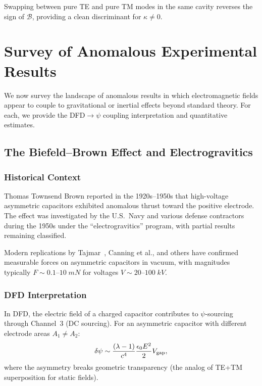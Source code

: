 \documentclass[aps,prd,twocolumn,superscriptaddress,floatfix,nofootinbib]{revtex4-2}
\newcommand{\lam}{\lambda}
\begin{document}
Swapping between pure TE and pure TM modes in the same cavity reverses the
sign of $\mathcal{B}$, providing a clean discriminant for $\kappa \neq 0$.

\section{Survey of Anomalous Experimental Results}\label{sec:anomalies}

We now survey the landscape of anomalous results in which electromagnetic
fields appear to couple to gravitational or inertial effects beyond standard
theory. For each, we provide the DFD$\to\psi$ coupling interpretation and
quantitative estimates.

\subsection{The Biefeld--Brown Effect and Electrogravitics}\label{sec:bb}

\subsubsection{Historical Context}

Thomas Townsend Brown reported in the 1920s--1950s that high-voltage
asymmetric capacitors exhibited anomalous thrust toward the positive
electrode. The effect was investigated by the U.S.\ Navy and various
defense contractors during the 1950s under the ``electrogravitics''
program, with partial results remaining classified.

Modern replications by Tajmar~\cite{Tajmar2004BB}, Canning et al., and
others have confirmed measurable forces on asymmetric capacitors in
vacuum, with magnitudes typically $F \sim 0.1$--$10\;\si{mN}$ for
voltages $V \sim 20$--$100\;\si{kV}$.

\subsubsection{DFD Interpretation}

In DFD, the electric field of a charged capacitor contributes to
$\psi$-sourcing through Channel~3 (DC sourcing). For an asymmetric
capacitor with different electrode areas $A_1 \neq A_2$:
\begin{equation}
\delta\psi \sim \frac{(\lam-1)}{c^4}\frac{\epsilon_0 E^2}{2}V_{\rm gap},
\end{equation}
where the asymmetry breaks geometric transparency (the analog of
TE+TM superposition for static fields).
\end{document}
